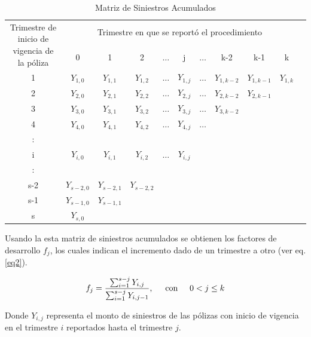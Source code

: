 \documentclass[11pt,twoside,openright,spanish]{report}
\numberwithin{equation}{chapter}
\numberwithin{figure}{chapter}
\numberwithin{table}{chapter}
\begin{document}
	\begin{table}[ht]
	\centering
		
	\begin{tabularx}{\linewidth}{c|cccccccccc}
		\multirow{2}{4cm}{Trimestre de inicio de vigencia de la póliza}&\multicolumn{9}{c}{ Trimestre en que se reportó el procedimiento} \\
		& 0  & 1 & 2 & $ \dots $ & j & $\dots $ & k-2 & k-1 &  k \\
		\midrule
		1      &  $Y_{1,0}^{}$ & $Y_{1,1}^{}$ & $Y_{1,2}^{}$ & $ \dots $ & $Y_{1,j}^{}$ & $ \dots $ & $Y_{1,k-2}^{}$ & $Y_{1,k-1}^{}$ & $Y_{1,k}^{}$ \\
		2      &  $Y_{2,0}^{}$ & $Y_{2,1}^{}$ & $Y_{2,2}^{}$ & $ \dots $ & $Y_{2,j}^{}$ & $ \dots $ & $Y_{2,k-2}^{}$ & $Y_{2,k-1}^{}$ & \\
		3      &  $Y_{3,0}^{}$ & $Y_{3,1}^{}$ & $Y_{3,2}^{}$ & $ \dots $ & $Y_{3,j}^{}$ & $ \dots $ & $Y_{3,k-2}^{}$ & & \\
		4      &  $Y_{4,0}^{}$ & $Y_{4,1}^{}$ & $Y_{4,2}^{}$ & $ \dots $ & $Y_{4,j}^{}$ & $ \dots $ & & & \\
		:      & & & & & & & & &\\
		i      &  $Y_{i,0}^{}$ & $Y_{i,1}^{}$ & $Y_{i,2}^{}$ & $ \dots $ & $Y_{i,j}^{}$ & & & & \\
		:      & & & & & & & & & \\
		s-2      &  $Y_{s-2,0}^{}$ & $Y_{s-2,1}^{}$ & $Y_{s-2,2}^{}$ & & & & & & \\
		s-1      &  $Y_{s-1,0}^{}$ & $Y_{s-1,1}^{}$ & & & & & & & \\
		s      &  $Y_{s,0}^{}$ & & & & & & & & \\
	\end{tabularx}
\caption{Matriz de Siniestros Acumulados}
\label{matrix2}
	\end{table} 
	
	
	Usando la esta matriz de siniestros acumulados se obtienen los factores de desarrollo ${f}_{j}$, los cuales indican el incremento dado de un trimestre a otro (ver eq. \ref{eq2}).

	\begin{equation}
	{f}_{j}=\frac{\sum _{i=1}^{s-j}{Y}_{i,j}}{\sum _{i=1}^{s-j}{Y}_{i,j-1}}, \hspace{0.5cm}\text{con}\hspace{0.5cm} 0< j\le k
	\label{eq2}
	\end{equation}

	Donde ${Y}_{i,j}$ representa el monto de siniestros de las pólizas con inicio de vigencia en el trimestre $i$ reportados hasta el trimestre $j$.
\end{document}

